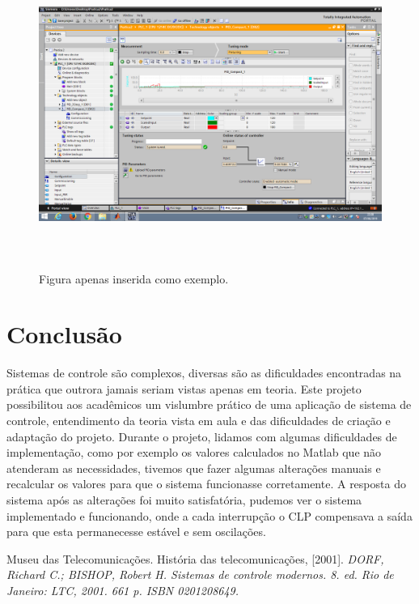 \documentclass[12pt,a4paper]{article}
\begin{document}
\begin{figure}[H]
	\centering
	\caption{Figura apenas inserida como exemplo.}
	\label{fig:9}	
	\includegraphics[height=10cm]{figuras/observacao.png} %
\end{figure}

\section{Conclusão}

Sistemas de controle são complexos, diversas são as dificuldades encontradas na prática que outrora jamais seriam vistas apenas em teoria. Este projeto possibilitou aos acadêmicos um vislumbre prático de uma aplicação de sistema de controle, entendimento da teoria vista em aula e das dificuldades de criação e adaptação do projeto. Durante o projeto, lidamos com algumas dificuldades de implementação, como por exemplo os valores calculados no Matlab que não atenderam as necessidades, tivemos que fazer algumas alterações manuais e recalcular os valores para que o sistema funcionasse corretamente. A resposta do sistema após as alterações foi muito satisfatória, pudemos ver o sistema implementado e funcionando, onde a cada interrupção o CLP compensava a saída para que esta permanecesse estável e sem oscilações.

\begin{thebibliography}{1}
Museu das Telecomunicações. História das telecomunicações, [2001].
\emph{DORF, Richard C.; BISHOP, Robert H. Sistemas de controle modernos. 8. ed. Rio de Janeiro: LTC, 2001. 661 p. ISBN 0201208649.}

\end{thebibliography}

\pagebreak
\clearpage
\newpage
\end{document}
